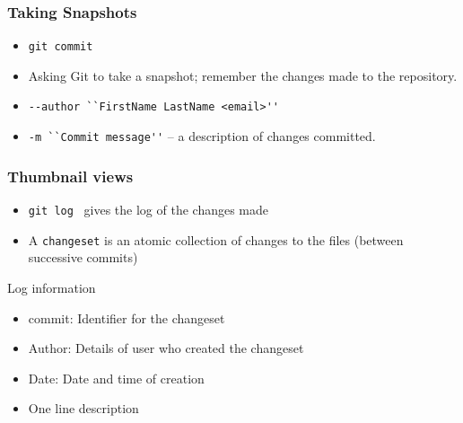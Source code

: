 \documentclass[14pt,compress]{beamer}
\newcounter{time}
\newcommand{\typ}[1]{\lstinline{#1}}
\begin{document}
\begin{frame}
  \frametitle{Taking Snapshots}
  \begin{itemize}
  \item \typ{git commit}
  \item Asking Git to take a snapshot; remember the changes made
    to the repository.
  \item \typ{--author ``FirstName LastName <email>''}
  \item \typ{-m ``Commit message''} -- a description of changes committed.
  \end{itemize}
\end{frame}

\begin{frame}
  \frametitle{Thumbnail views}
  \begin{itemize}
  \item \typ{git log}~ gives the log of the changes made
  \item A \typ{changeset} is an atomic collection of changes to the
    files (between successive commits)
  \end{itemize}
  \begin{block}{Log information}
    \begin{itemize}
    \item \alert{commit}: Identifier for the changeset
    \item \alert{Author}: Details of user who created the changeset
    \item \alert{Date}: Date and time of creation
    \item One line description
    \end{itemize}
  \end{block}
\end{frame}

\end{document}
